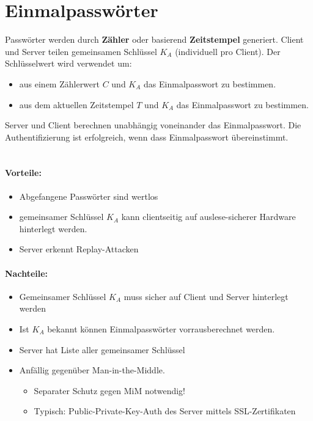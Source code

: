 \section{Einmalpasswörter}
Passwörter werden durch \textbf{Zähler} oder basierend \textbf{Zeitstempel} generiert.
Client und Server teilen gemeinsamen Schlüssel $K_A$ (individuell pro Client).
Der Schlüsselwert wird verwendet um:
\begin{itemize}
	\item aus einem Zählerwert $C$ und $K_A$ das Einmalpasswort zu bestimmen.
	\item aus dem aktuellen Zeitstempel $T$ und $K_A$ das Einmalpasswort zu bestimmen.
\end{itemize}
Server und Client berechnen unabhängig voneinander das Einmalpasswort. Die Authentifizierung ist erfolgreich, wenn dass Einmalpasswort übereinstimmt.\\
\\
\paragraph{Vorteile:}
\begin{itemize}
	\item Abgefangene Passwörter sind wertlos
	\item gemeinsamer Schlüssel $K_A$ kann clientseitig auf auslese-sicherer Hardware hinterlegt werden.
	\item Server erkennt Replay-Attacken
\end{itemize}
\paragraph{Nachteile:}
\begin{itemize}
	\item Gemeinsamer Schlüssel $K_A$ muss sicher auf Client und Server hinterlegt werden
	\item Ist $K_A$ bekannt können Einmalpasswörter vorrausberechnet werden. 
	\item Server hat Liste aller gemeinsamer Schlüssel
	\item Anfällig gegenüber Man-in-the-Middle.
	\begin{itemize}
		\item Separater Schutz gegen MiM notwendig!
		\item Typisch: Public-Private-Key-Auth des Server mittels SSL-Zertifikaten
	\end{itemize}
\end{itemize}

